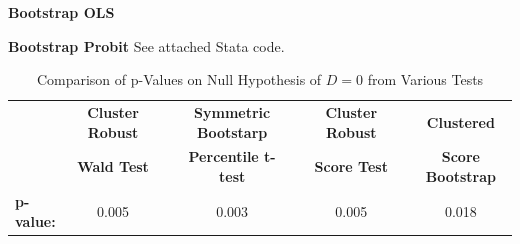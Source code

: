 \documentclass[11pt]{article}
\begin{document}
\bigskip \textbf{Bootstrap OLS}

\bigskip \textbf{Bootstrap Probit}
See attached Stata code.
\begin{table}[htbp]
  \centering
  \caption{Comparison of p-Values on Null Hypothesis of $D = 0$ from Various Tests}
  \begin{adjustbox}{max width=\textwidth}
    \begin{tabular}{lccccccc}
    \toprule
          & \textbf{Cluster Robust} &       & \textbf{Symmetric Bootstarp} &       & \textbf{Cluster Robust} &       & \textbf{Clustered} \\
          & \textbf{Wald Test} &       & \textbf{Percentile t-test} &       & \textbf{Score Test} &       & \textbf{Score Bootstrap} \\
\cmidrule{2-2}\cmidrule{4-4}\cmidrule{6-6}\cmidrule{8-8}    \textbf{p-value:} & 0.005 &       & 0.003 &       & 0.005 &       & 0.018 \\
    \bottomrule
    \end{tabular}%
    \end{adjustbox}
  \label{tab:addlabel}%
\end{table}%
\end{document}
